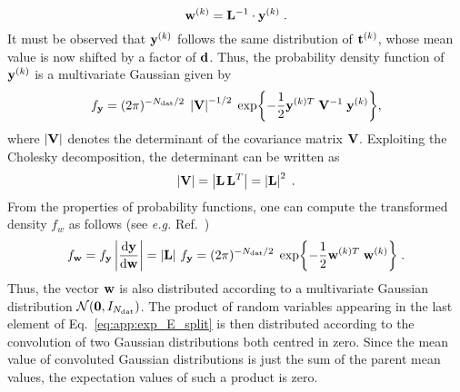 \begin{equation}
    \mathbf{w}^{(k)} = \mathbf{L}^{-1} \cdot \mathbf{y}^{(k)} \;.
\end{equation}
It must be observed that $\mathbf{y}^{(k)}$ follows the same distribution of $\mathbf{t}^{(k)}$, whose mean value is now shifted by a factor of $\mathbf{d}$. Thus, the probability density function of $\mathbf{y}^{(k)}$ is a multivariate Gaussian given by
\begin{equation}
    f_{\mathbf{y}} = (2\pi)^{-N_{\textrm{dat}}/2} \; \left| \mathbf{V} \right|^{-1/2} \; \exp{-\frac{1}{2}{\mathbf{y}}^{(k)T} \; \mathbf{V}^{-1} \; \mathbf{y}^{(k)}},
\end{equation}
where $\left| \mathbf{V} \right|$ denotes the determinant of the covariance matrix $\mathbf{V}$. Exploiting the Cholesky decomposition, the determinant can be written as 
\begin{equation}
    \left| \mathbf{V} \right| = \left| \mathbf{L} \, \mathbf{L}^T \right| = \left| \mathbf{L} \right|^2 \;.
\end{equation}
From the properties of probability functions, one can compute the transformed density $f_w$ as follows (see \textit{e.g.} Ref.~\cite{Bohm:2005bu})
\begin{equation}
    f_{\mathbf{w}} = f_{\mathbf{y}} \left| \dv{\mathbf{y}}{\mathbf{w}} \right| = \left|\mathbf{L} \right| \, f_{\mathbf{y}} = (2\pi)^{-N_{\textrm{dat}}/2} \; \exp{-\frac{1}{2}\mathbf{w}^{(k)T} \; \mathbf{w}^{(k)}} \; .
\end{equation}
Thus, the vector $\mathbf{w}$ is also distributed according to a multivariate Gaussian distribution $\mathcal{N} (\mathbf{0}, I_{N_{\textrm{dat}}})$. The product of random variables appearing in the last element of Eq.~\eqref{eq:app:exp_E_split} is then distributed according to the convolution of two Gaussian distributions both centred in zero. Since the mean value of convoluted Gaussian distributions is just the sum of the parent mean values, the expectation values of such a product is zero.